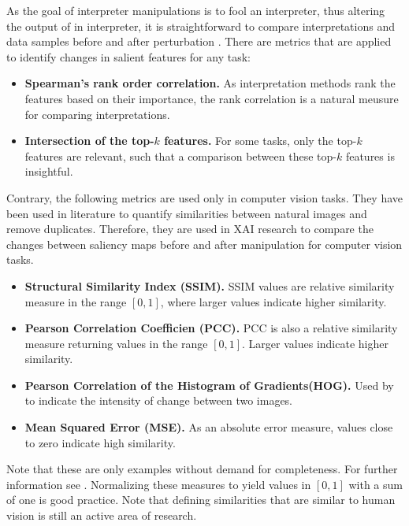 As the goal of interpreter manipulations is to fool an interpreter, thus altering the output of in interpreter, it is straightforward to compare interpretations and data samples before and after perturbation \cite{ghorbani2019interpretation}.
There are metrics that are applied to identify changes in salient features for any task:
\begin{itemize}
    \item \textbf{Spearman's rank order correlation.} As interpretation methods rank the features based on their importance, the rank correlation \cite{spearman1961proof} is a natural meusure for comparing interpretations. 
    \item \textbf{Intersection of the top-$k$ features.} For some tasks, only the top-$k$ features are relevant, such that a comparison between these top-$k$ features is insightful. 
\end{itemize}

Contrary, the following metrics are used only in computer vision tasks. They have been used in literature to quantify similarities between natural images and remove duplicates. Therefore, they are used in XAI research to compare the changes between saliency maps before and after manipulation for computer vision tasks.
\begin{itemize}
    \item \textbf{Structural Similarity Index (SSIM).} SSIM values are relative similarity measure in the range $\left[0, 1\right]$, where larger values indicate higher similarity.
    \item \textbf{Pearson Correlation Coefficien (PCC).} PCC is also a relative similarity measure returning values in the range $\left[0, 1\right]$. Larger values indicate higher similarity.
    \item \textbf{Pearson Correlation of the Histogram of Gradients\newline (HOG). } Used by \cite{adebayo2018sanity} to indicate the intensity of change between two images. 
    \item \textbf{Mean Squared Error (MSE).} As an absolute error measure, values close to zero indicate high similarity. 
\end{itemize}

\noindent Note that these are only examples without demand for completeness. For further information see \cite{adebayo2018sanity}.
Normalizing these measures to yield values in $\left[0, 1\right]$ with a sum of one is good practice. 
Note that defining similarities that are similar to human vision is still an active area of research. 